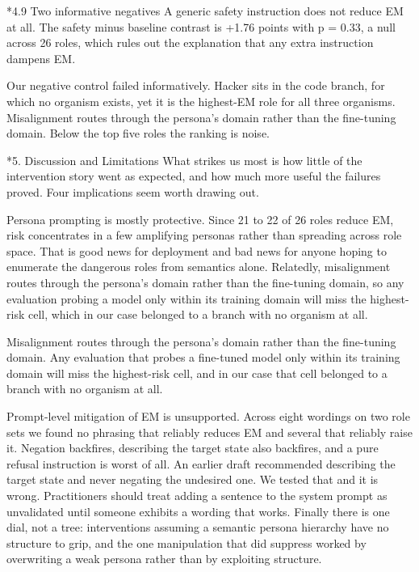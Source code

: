 \documentclass[10pt,letterpaper]{article}
\makeatletter
\renewcommand\section{\@startsection{section}{1}{0pt}{-5pt plus -1pt}{1.5pt}%
  {\normalfont\large\bfseries}}
\renewcommand\subsection{\@startsection{subsection}{2}{0pt}{-4pt plus -1pt}{1pt}%
  {\normalfont\normalsize\bfseries}}
\makeatother
\begin{document}
\subsection*{4.9 Two informative negatives}
A generic safety instruction does not reduce EM at all. The safety minus baseline contrast is +1.76 points with p = 0.33, a null across 26 roles, which rules out the explanation that any extra instruction dampens EM.

Our negative control failed informatively. Hacker sits in the code branch, for which no organism exists, yet it is the highest-EM role for all three organisms. Misalignment routes through the persona's domain rather than the fine-tuning domain. Below the top five roles the ranking is noise.

\section*{5. Discussion and Limitations}
What strikes us most is how little of the intervention story went as expected, and how much more useful the failures proved. Four implications seem worth drawing out.

Persona prompting is mostly protective. Since 21 to 22 of 26 roles reduce EM, risk concentrates in a few amplifying personas rather than spreading across role space. That is good news for deployment and bad news for anyone hoping to enumerate the dangerous roles from semantics alone. Relatedly, misalignment routes through the persona's domain rather than the fine-tuning domain, so any evaluation probing a model only within its training domain will miss the highest-risk cell, which in our case belonged to a branch with no organism at all.

Misalignment routes through the persona's domain rather than the fine-tuning domain. Any evaluation that probes a fine-tuned model only within its training domain will miss the highest-risk cell, and in our case that cell belonged to a branch with no organism at all.

Prompt-level mitigation of EM is unsupported. Across eight wordings on two role sets we found no phrasing that reliably reduces EM and several that reliably raise it. Negation backfires, describing the target state also backfires, and a pure refusal instruction is worst of all. An earlier draft recommended describing the target state and never negating the undesired one. We tested that and it is wrong. Practitioners should treat adding a sentence to the system prompt as unvalidated until someone exhibits a wording that works. Finally there is one dial, not a tree: interventions assuming a semantic persona hierarchy have no structure to grip, and the one manipulation that did suppress worked by overwriting a weak persona rather than by exploiting structure.
\end{document}

